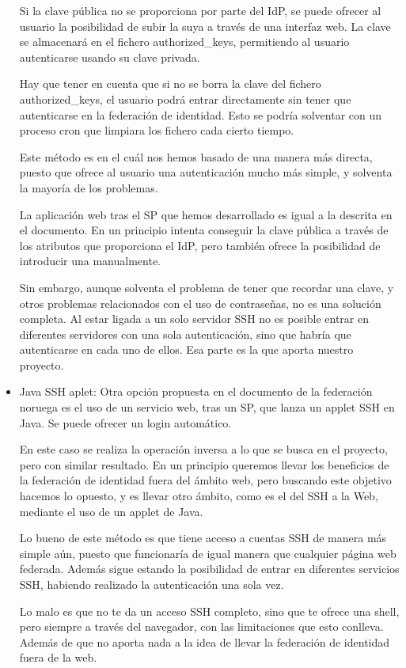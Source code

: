 \begin{itemize}
        Si la clave pública no se proporciona por parte del IdP, se
        puede ofrecer al usuario la posibilidad de subir la suya a
        través de una interfaz web. La clave se almacenará en el
        fichero authorized\_keys, permitiendo al usuario autenticarse
        usando su clave privada.

        Hay que tener en cuenta que si no se borra la clave del
        fichero authorized\_keys, el usuario podrá entrar directamente
        sin tener que autenticarse en la federación de identidad. Esto
        se podría solventar con un proceso cron que limpiara los
        fichero cada cierto tiempo.

        Este método es en el cuál nos hemos basado de una manera más
        directa, puesto que ofrece al usuario una autenticación mucho
        más simple, y solventa la mayoría de los problemas.

        La aplicación web tras el SP que hemos desarrollado es igual a
        la descrita en el documento. En un principio intenta conseguir
        la clave pública a través de los atributos que proporciona el
        IdP, pero también ofrece la posibilidad de introducir una
        manualmente.

        Sin embargo, aunque solventa el problema de tener que recordar
        una clave, y otros problemas relacionados con el uso de
        contraseñas, no es una solución completa. Al estar ligada a un
        solo servidor SSH no es posible entrar en diferentes
        servidores con una sola autenticación, sino que habría que
        autenticarse en cada uno de ellos. Esa parte es la que aporta
        nuestro proyecto.

        \item{Java SSH aplet:}
        Otra opción propuesta en el documento de la federación noruega
        es el uso de un servicio web, tras un SP, que lanza un applet
        SSH en Java. Se puede ofrecer un login automático.

        En este caso se realiza la operación inversa a lo que se busca
        en el proyecto, pero con similar resultado. En un principio
        queremos llevar los beneficios de la federación de identidad
        fuera del ámbito web, pero buscando este objetivo hacemos lo
        opuesto, y es llevar otro ámbito, como es el del SSH a la Web,
        mediante el uso de un applet de Java.

        Lo bueno de este método es que tiene acceso a cuentas SSH de
        manera más simple aún, puesto que funcionaría de igual manera
        que cualquier página web federada. Además sigue estando la
        posibilidad de entrar en diferentes servicios SSH, habiendo
        realizado la autenticación una sola vez.


        Lo malo es que no te da un acceso SSH completo, sino que te
        ofrece una shell, pero siempre a través del navegador, con las
        limitaciones que esto conlleva. Además de que no aporta nada a
        la idea de llevar la federación de identidad fuera de la web.

    \end{itemize}

